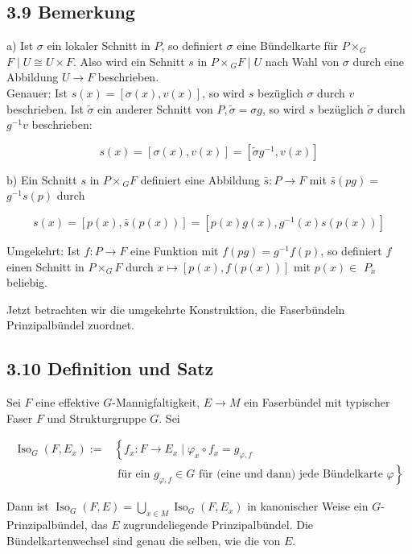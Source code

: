 \documentclass[10pt, letterpaper]{article}
\begin{document}
\subsection*{3.9 Bemerkung}
a) Ist $\sigma$ ein lokaler Schnitt in $P$, so definiert $\sigma$ eine Bündelkarte für $P \times_{G}$ $F \mid U \cong U \times F$. Also wird ein Schnitt $s$ in $P \times{ }_{G} F \mid U$ nach Wahl von $\sigma$ durch eine Abbildung $U \rightarrow F$ beschrieben.\\
Genauer: Ist $s(x)=[\sigma(x), v(x)]$, so wird $s$ bezüglich $\sigma$ durch $v$ beschrieben. Ist $\tilde{\sigma}$ ein anderer Schnitt von $P, \tilde{\sigma}=\sigma g$, so wird $s$ bezüglich $\tilde{\sigma}$ durch $g^{-1} v$ beschrieben:

$$
s(x)=[\sigma(x), v(x)]=\left[\tilde{\sigma} g^{-1}, v(x)\right]
$$

b) Ein Schnitt $s$ in $P \times{ }_{G} F$ definiert eine Abbildung $\bar{s}: P \rightarrow F$ mit $\bar{s}(p g)=$ $g^{-1} s(p)$ durch

$$
s(x)=[p(x), \bar{s}(p(x))]=\left[p(x) g(x), g^{-1}(x) s(p(x))\right]
$$

Umgekehrt: Ist $f: P \rightarrow F$ eine Funktion mit $f(p g)=g^{-1} f(p)$, so definiert $f$ einen Schnitt in $P \times_{G} F$ durch $x \mapsto[p(x), f(p(x))]$ mit $p(x) \in$ $P_{x}$ beliebig.

Jetzt betrachten wir die umgekehrte Konstruktion, die Faserbündeln Prinzipalbündel zuordnet.

\subsection*{3.10 Definition und Satz}
Sei $F$ eine effektive $G$-Mannigfaltigkeit, $E \rightarrow M$ ein Faserbündel mit typischer Faser $F$ und Strukturgruppe $G$. Sei


\begin{align*}
\operatorname{Iso}_{G}\left(F, E_{x}\right):= & \left\{f_{x}: F \rightarrow E_{x} \mid \varphi_{x} \circ f_{x}=g_{\varphi, f}\right. \\
& \text { für ein } \left.g_{\varphi, f} \in G \text { für (eine und dann) jede Bündelkarte } \varphi\right\} \tag{*}
\end{align*}


Dann ist $\operatorname{Iso}_{G}(F, E)=\bigcup_{x \in M} \operatorname{Iso}_{G}\left(F, E_{x}\right)$ in kanonischer Weise ein $G$-Prinzipalbündel, das $E$ zugrundeliegende Prinzipalbündel. Die Bündelkartenwechsel sind genau die selben, wie die von $E$.
\end{document}
